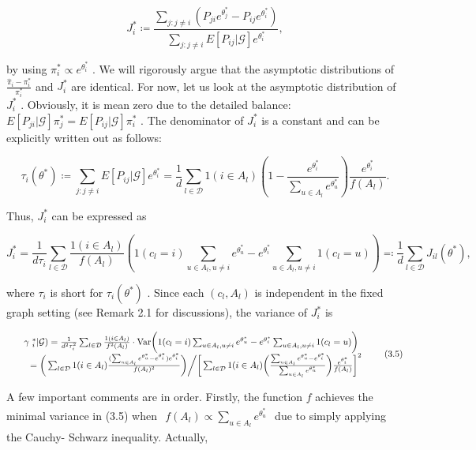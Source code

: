 \[
J_{i}^{*}\coloneqq \frac{\sum_{j:j\neq i}(P_{ji}e^{\theta_{j}^{*}} - P_{ij}e^{\theta_{i}^{*}})}{\sum_{j:j\neq i}E[P_{ij}|\mathcal{G}]e^{\theta_{i}^{*}}}, \tag{3.2}
\]

by using \(\pi_{i}^{*}\propto e^{\theta_{i}^{*}}\) . We will rigorously
argue that the asymptotic distributions of
\(\frac{\widehat{\pi}_{i} - \pi_{i}^{*}}{\pi_{i}^{*}}\) and
\(J_{i}^{*}\) are identical. For now, let us look at the asymptotic
distribution of \(J_{i}^{*}\) . Obviously, it is mean zero due to the
detailed balance:
\(E[P_{ji}|\mathcal{G}]\pi_{j}^{*} = E[P_{ij}|\mathcal{G}]\pi_{i}^{*}\)
. The denominator of \(J_{i}^{*}\) is a constant and can be explicitly
written out as follows:

\[
\tau_{i}(\theta^{*})\coloneqq \sum_{j:j\neq i}E[P_{ij}|\mathcal{G}]e^{\theta_{i}^{*}} = \frac{1}{d}\sum_{l\in \mathcal{D}}1(i\in A_{l})\left(1 - \frac{e^{\theta_{i}^{*}}}{\sum_{u\in A_{l}}e^{\theta_{u}^{*}}}\right)\frac{e^{\theta_{i}^{*}}}{f(A_{l})}. \tag{3.3}
\]

Thus, \(J_{i}^{*}\) can be expressed as

\[
J_{i}^{*} = \frac{1}{d\tau_{i}}\sum_{l\in \mathcal{D}}\frac{1(i\in A_{l})}{f(A_{l})}\left(1(c_{l} = i)\sum_{u\in A_{l},u\neq i}e^{\theta_{u}^{*}} - e^{\theta_{i}^{*}}\sum_{u\in A_{l},u\neq i}1(c_{l} = u)\right)\eqqcolon \frac{1}{d}\sum_{l\in \mathcal{D}}J_{i l}(\theta^{*}), \tag{3.4}
\]

where \(\tau_{i}\) is short for \(\tau_{i}(\theta^{*})\) . Since each
\((c_{l},A_{l})\) is independent in the fixed graph setting (see Remark
2.1 for discussions), the variance of \(J_{i}^{*}\) is

\[
\begin{array}{r l} & {\mathrm{~\gamma~}_{i}^{*}|\mathcal{G}) = \frac{1}{d^{2}\tau_{i}^{2}}\sum_{l\in \mathcal{D}}\frac{1(i\in A_{l})}{f^{2}(A_{l})}\cdot \mathrm{Var}\bigg(1(c_{l} = i)\sum_{u\in A_{l},u\neq i}e^{\theta_{u}^{*}} - e^{\theta_{i}^{*}}\sum_{u\in A_{l},u\neq i}1(c_{l} = u)\bigg)}\\ & {\quad = \bigg(\sum_{l\in \mathcal{D}}1(i\in A_{l})\frac{(\sum_{u\in A_{l}}e^{\theta_{u}^{*}} - e^{\theta_{i}^{*}})e^{\theta_{i}^{*}}}{f(A_{l})^{2}}\bigg)\bigg / \bigg[\sum_{l\in \mathcal{D}}1(i\in A_{l})\bigg(\frac{\sum_{u\in A_{l}}e^{\theta_{u}^{*}} - e^{\theta_{i}^{*}}}{\sum_{u\in A_{l}}e^{\theta_{u}^{*}}}\bigg)\frac{e^{\theta_{i}^{*}}}{f(A_{l})}\bigg]^{2}} \end{array} \tag{3.5}
\]

A few important comments are in order. Firstly, the function \(f\)
achieves the minimal variance in (3.5) when
\(\begin{array}{r}{f(A_{l})\propto \sum_{u\in A_{l}}e^{\theta_{u}^{*}}} \end{array}\)
due to simply applying the Cauchy- Schwarz inequality. Actually,

